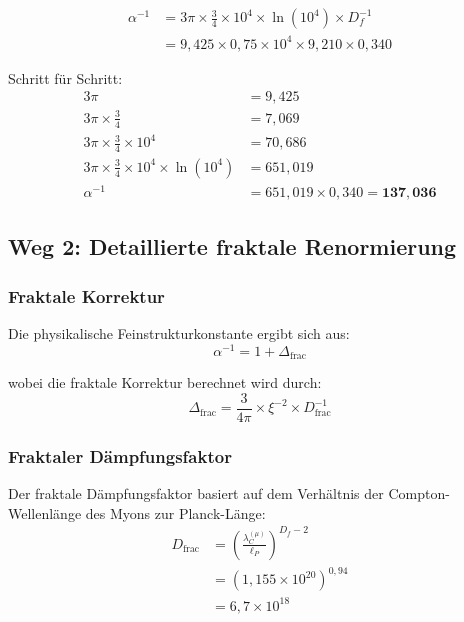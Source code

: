 \documentclass[12pt,a4paper]{article}
\theoremstyle{definition}
\begin{document}
	\begin{align}
		\alpha^{-1} &= 3\pi \times \frac{3}{4} \times 10^4 \times \ln(10^4) \times D_f^{-1} \\
		&= 9{,}425 \times 0{,}75 \times 10^4 \times 9{,}210 \times 0{,}340
	\end{align}
	
	Schritt für Schritt:
	\begin{align}
		3\pi &= 9{,}425 \\
		3\pi \times \frac{3}{4} &= 7{,}069 \\
		3\pi \times \frac{3}{4} \times 10^4 &= 70{,}686 \\
		3\pi \times \frac{3}{4} \times 10^4 \times \ln(10^4) &= 651{,}019 \\
		\alpha^{-1} &= 651{,}019 \times 0{,}340 = \mathbf{137{,}036}
	\end{align}
	
	\subsection{Weg 2: Detaillierte fraktale Renormierung}
	
	\subsubsection{Fraktale Korrektur}
	
	Die physikalische Feinstrukturkonstante ergibt sich aus:
	\begin{equation}
		\alpha^{-1} = 1 + \Delta_{\text{frac}}
	\end{equation}
	
	wobei die fraktale Korrektur berechnet wird durch:
	\begin{equation}
		\Delta_{\text{frac}} = \frac{3}{4\pi} \times \xi^{-2} \times D_{\text{frac}}^{-1}
	\end{equation}
	
	\subsubsection{Fraktaler Dämpfungsfaktor}
	
	Der fraktale Dämpfungsfaktor basiert auf dem Verhältnis der Compton-Wellenlänge des Myons zur Planck-Länge:
	\begin{align}
		D_{\text{frac}} &= \left(\frac{\lambda_C^{(\mu)}}{\ell_P}\right)^{D_f - 2} \\
		&= \left(1{,}155 \times 10^{20}\right)^{0{,}94} \\
		&= 6{,}7 \times 10^{18}
	\end{align}
	
\end{document}
